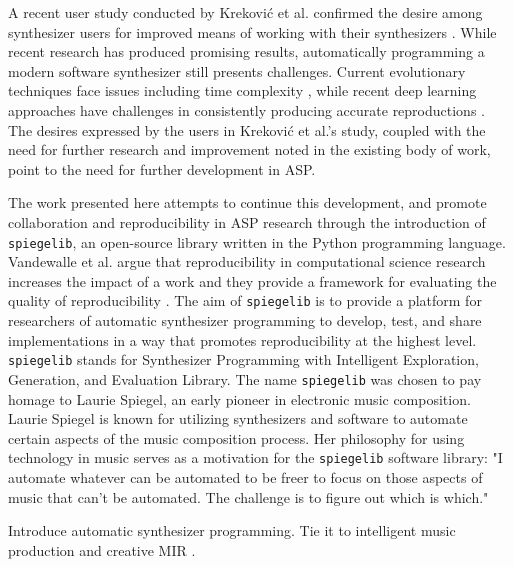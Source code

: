  A recent user study conducted by Krekovi{\'c} et al. confirmed the desire among synthesizer users for improved means of working with their synthesizers \cite{krekovic2019insights}. 
 While recent research has produced promising results, automatically programming a modern software synthesizer still presents challenges. Current evolutionary techniques face issues including time complexity \cite{tatar2016automatic}, while recent deep learning approaches have challenges in consistently producing accurate reproductions \cite{yee2018automatic}. The desires expressed by the users in Krekovi{\'c} et al.'s study, coupled with the need for further research and improvement noted in the existing body of work, point to the need for further development in ASP.
 
 The work presented here attempts to continue this development, and promote collaboration and reproducibility in ASP research through the introduction of \texttt{spiegelib}, an open-source library written in the Python programming language. Vandewalle et al. argue that reproducibility in computational science research increases the impact of a work and they provide a framework for evaluating the quality of reproducibility \cite{vandewalle2009reproducible}. The aim of \texttt{spiegelib} is to provide a platform for researchers of automatic synthesizer programming to develop, test, and share implementations in a way that promotes reproducibility at the highest level. \texttt{spiegelib} stands for Synthesizer Programming with Intelligent Exploration, Generation, and Evaluation Library. The name \texttt{spiegelib} was chosen to pay homage to Laurie Spiegel, an early pioneer in electronic music composition. Laurie Spiegel is known for utilizing synthesizers and software to automate certain aspects of the music composition process. Her philosophy for using technology in music serves as a motivation for the \texttt{spiegelib} software library: "I automate whatever can be automated to be freer to focus on those aspects of music that can't be automated. The challenge is to figure out which is which." \cite{hinkle2006women}


Introduce automatic synthesizer programming. Tie it to intelligent music production \cite{moffat2019approaches} \cite{de2017ten} and creative MIR \cite{humphrey2013brief}.

